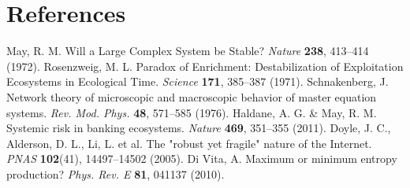 \documentclass[11pt,a4paper]{article}
\begin{document}
\section*{References}
\begin{thebibliography}{99}
 May, R. M. Will a Large Complex System be Stable? \emph{Nature} \textbf{238}, 413–414 (1972).
 Rosenzweig, M. L. Paradox of Enrichment: Destabilization of Exploitation Ecosystems in Ecological Time. \emph{Science} \textbf{171}, 385–387 (1971).
 Schnakenberg, J. Network theory of microscopic and macroscopic behavior of master equation systems. \emph{Rev. Mod. Phys.} \textbf{48}, 571–585 (1976).
 Haldane, A. G. \& May, R. M. Systemic risk in banking ecosystems. \emph{Nature} \textbf{469}, 351–355 (2011).
 Doyle, J. C., Alderson, D. L., Li, L. et al. The "robust yet fragile" nature of the Internet. \emph{PNAS} \textbf{102}(41), 14497–14502 (2005).
 Di Vita, A. Maximum or minimum entropy production? \emph{Phys. Rev. E} \textbf{81}, 041137 (2010).
\end{thebibliography}
\end{document}
